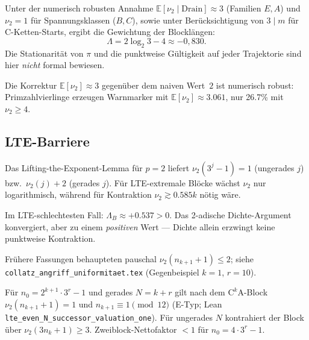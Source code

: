 \documentclass[12pt,a4paper]{article}
\newcommand{\vii}{\nu_2}
\newcommand{\Lam}{\Lambda}
\begin{document}
\begin{tcolorbox}[heuristik,title={Negativer mittlerer Drift}]
Unter der numerisch robusten Annahme $\mathbb{E}[\vii \mid \text{Drain}]
\approx 3$ (Familien $E,A$) und $\vii = 1$ für Spannungsklassen
($B,C$), sowie unter Berücksichtigung von $3 \mid m$ für C-Ketten-Starts,
ergibt die Gewichtung der Blocklängen:
\[
  \boxed{\Lam = 2\log_2 3 - 4 \approx -0{,}830.}
\]
Die Stationarität von $\pi$ und die punktweise Gültigkeit auf jeder
Trajektorie sind hier \emph{nicht} formal bewiesen.
\end{tcolorbox}

Die Korrektur $\mathbb{E}[\vii] \approx 3$ gegenüber dem naiven Wert~$2$
ist numerisch robust: Primzahlvierlinge erzeugen Warnmarker mit
$\mathbb{E}[\vii] \approx 3.061$, nur 26.7\% mit $\vii \geq 4$.

\subsection{LTE-Barriere}

Das Lifting-the-Exponent-Lemma für $p=2$ liefert
$\vii(3^j-1) = 1$ (ungerades $j$) bzw.\ $\vii(j)+2$ (gerades $j$).
Für LTE-extremale Blöcke wächst $\vii$ nur logarithmisch, während für
Kontraktion $\vii \gtrsim 0.585k$ nötig wäre.

\begin{tcolorbox}[offen,title={Szenario B: Dichte allein reicht nicht}]
Im LTE-schlechtesten Fall: $\Lambda_B \approx +0.537 > 0$.
Das 2-adische Dichte-Argument konvergiert, aber zu einem \emph{positiven}
Wert --- Dichte allein erzwingt keine punktweise Kontraktion.
\end{tcolorbox}

\begin{tcolorbox}[colback=red!8,colframe=lueckenrot,title={Korrektur (Juni 2026)}]
Frühere Fassungen behaupteten pauschal $\vii(n_{k+1}+1)\leq 2$; siehe
\texttt{collatz\_angriff\_uniformitaet.tex} (Gegenbeispiel $k{=}1$, $r{=}10$).
\end{tcolorbox}
\begin{tcolorbox}[bewiesen,title={Strukturelle Kompensation (präzise)}]
Für $n_0 = 2^{k+1}\cdot 3^r - 1$ und gerades $N=k+r$ gilt nach dem
$\mathrm{C}^k\mathrm{A}$-Block $\vii(n_{k+1}+1)=1$ und
$n_{k+1}\equiv 1\pmod{12}$ (E-Typ; Lean
\texttt{lte\_even\_N\_successor\_valuation\_one}).
Für ungerades $N$ kontrahiert der Block über $\vii(3n_k+1)\geq 3$.
Zweiblock-Nettofaktor $< 1$ für $n_0 = 4\cdot 3^r - 1$.
\end{tcolorbox}
\end{document}
